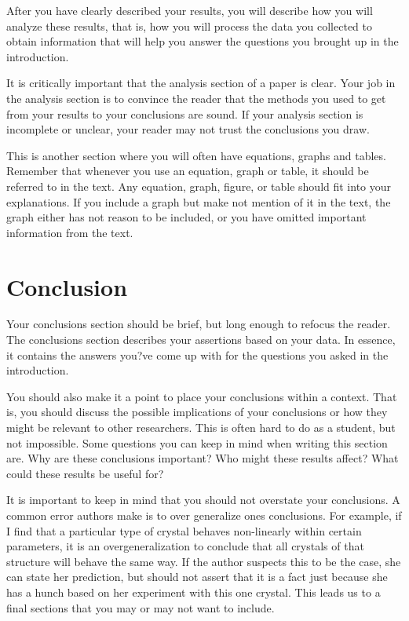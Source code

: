 \documentclass[preprint,pre,floats,aps,amsmath,amssymb]{revtex4}
\begin{document}
After you have clearly described your results, you will describe how
you will analyze these results, that is, how you will process the data
you collected to obtain information that will help you answer the
questions you brought up in the introduction. 

It is critically important that the analysis section of a paper is
clear.  Your job in the analysis section is to convince the reader
that the methods you used to get from your results to your conclusions
are sound.  If your analysis section is incomplete or unclear, your
reader may not trust the conclusions you draw.  

This is another section where you will often have equations, graphs
and tables.  Remember that whenever you use an equation, graph or
table, it should be referred to in the text.  Any equation, graph,
figure, or table should fit into your explanations.  If you include a
graph but make not mention of it in the text, the graph either has not
reason to be included, or you have omitted important information from
the text.

\section{Conclusion}
\label{sec:conclusion}

Your conclusions section should be brief, but long enough to refocus
the reader.  The conclusions section describes your assertions based
on your data.  In essence, it contains the answers you?ve come up with
for the questions you asked in the introduction.  

You should also make it a point to place your conclusions within a
context.  That is, you should discuss the possible implications of
your conclusions or how they might be relevant to other researchers. 
This is often hard to do as a student, but not impossible. Some
questions you can keep in mind when  writing this section are.  Why
are these conclusions important?  Who might these results affect? 
What could these results be useful for? 

It is important to keep in mind that you should not overstate your
conclusions.  A common error authors make is to over generalize ones
conclusions.  For example, if I find that a particular type of crystal
behaves non-linearly within certain parameters, it is an
overgeneralization to conclude that all crystals of that structure
will behave the same way.  If the author suspects this to be the case,
she can state her prediction, but should not assert that it is a fact
just because she has a hunch based on her experiment with this one
crystal.  This leads us to a final sections that you may or may not
want to include.
\end{document}
